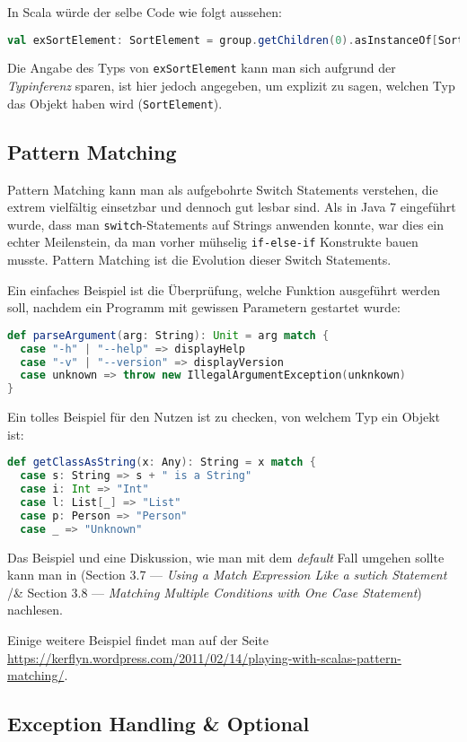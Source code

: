 In Scala würde der selbe Code wie folgt aussehen:
\begin{lstlisting}[language=Scala,numbers=none,caption=Casting in Scala: Von Node zu SortElement]
val exSortElement: SortElement = group.getChildren(0).asInstanceOf[SortElement]
\end{lstlisting}

Die Angabe des Typs von \texttt{exSortElement} kann man sich aufgrund der \textit{Typinferenz} sparen, ist hier jedoch angegeben, um explizit zu sagen, welchen Typ das Objekt haben wird (\texttt{SortElement}).

\subsection{Pattern Matching}
Pattern Matching kann man als aufgebohrte Switch Statements verstehen, die extrem vielfältig einsetzbar und dennoch gut lesbar sind. Als in Java 7 eingeführt wurde, dass man \texttt{switch}-Statements auf Strings anwenden konnte, war dies ein echter Meilenstein, da man vorher mühselig \texttt{if-else-if} Konstrukte bauen musste. Pattern Matching ist die Evolution dieser Switch Statements.

Ein einfaches Beispiel ist die Überprüfung, welche Funktion ausgeführt werden soll, nachdem ein Programm mit gewissen Parametern gestartet wurde:

\begin{lstlisting}[language=Scala, caption=Pattern Matching mit Strings]
def parseArgument(arg: String): Unit = arg match {
  case "-h" | "--help" => displayHelp
  case "-v" | "--version" => displayVersion
  case unknown => throw new IllegalArgumentException(unknkown)
}
\end{lstlisting}

Ein tolles Beispiel für den Nutzen ist zu checken, von welchem Typ ein Objekt ist:
\begin{lstlisting}[language=Scala,caption=Type-Checking mit Pattern Matching]
def getClassAsString(x: Any): String = x match {
  case s: String => s + " is a String"
  case i: Int => "Int"
  case l: List[_] => "List"
  case p: Person => "Person"
  case _ => "Unknown"
\end{lstlisting}

Das Beispiel und eine Diskussion, wie man mit dem \textit{default} Fall umgehen sollte kann man in \cite{ScalaCookbook} (Section 3.7 --- \textit{Using a Match Expression Like a swtich Statement} /& Section 3.8 --- \textit{Matching Multiple Conditions with One Case Statement}) nachlesen.

Einige weitere Beispiel findet man auf der Seite \url{https://kerflyn.wordpress.com/2011/02/14/playing-with-scalas-pattern-matching/}.

\subsection{Exception Handling \& Optional}
